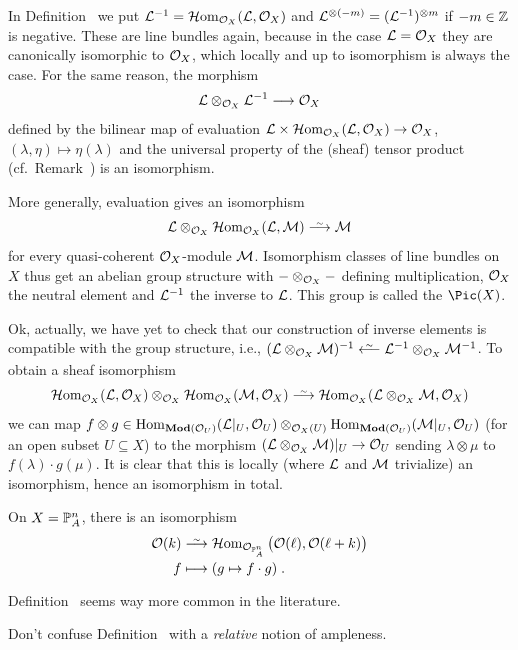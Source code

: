 \documentclass[a4paper,parskip=half,numbers=enddot, DIV=12]{scrreprt}
\begin{document}
\begin{rem}
	\begin{alphanumerate}
		\item {}In Definition~ we put $\mathcal{L}^{-1}=\operatorname{\mathcal{H} om}_{\mathcal{O}_X}(\mathcal{L},\mathcal{O}_X)$ and $\mathcal{L}^{\otimes (-m)}=(\mathcal{L}^{-1})^{\otimes m}$ if $-m\in\mathbb{Z}$ is negative. These are line bundles again, because in the case $\mathcal{L}=\mathcal{O}_X$ they are canonically isomorphic to $\mathcal{O}_X$, which locally and up to isomorphism is always the case. For the same reason, the morphism
		\begin{align*}
			\Ll\otimes_{\Oo_X}\Ll^{-1}\morphism\Oo_X
		\end{align*}
		defined by the bilinear map of evaluation $\Ll\times\Hhom_{\Oo_X}(\Ll,\Oo_X)\morphism\Oo_X$, $(\lambda,\eta)\mapsto\eta(\lambda)$ and the universal property of the (sheaf) tensor product (cf.\ Remark~) is an isomorphism. 
		
		More generally, evaluation gives an isomorphism 
		\begin{align*}
			\Ll\otimes_{\Oo_X}\Hhom_{\Oo_X}(\Ll,\Mm)\isomorphism\Mm
		\end{align*}
		for every quasi-coherent $\mathcal{O}_X$-module $\mathcal{M}$. Isomorphism classes of line bundles on $X$ thus get an abelian group structure with $-\otimes_{\mathcal{O}_X}-$ defining multiplication, $\mathcal{O}_X$ the neutral element and $\mathcal{L}^{-1}$ the inverse to $\mathcal{L}$. This group is called the  $\Pic(X)$.
		
		Ok, actually, we have yet to check that our construction of inverse elements is compatible with the group structure, i.e., $(\Ll\otimes_{\Oo_X}\Mm)^{-1}\lisomorphism \Ll^{-1}\otimes_{\Oo_X}\Mm^{-1}$. To obtain a sheaf isomorphism 
		\begin{align*}
			\Hhom_{\Oo_X}(\Ll,\Oo_X)\otimes_{\Oo_X}\Hhom_{\Oo_X}(\Mm,\Oo_X)\isomorphism\Hhom_{\Oo_X}(\Ll\otimes_{\Oo_X}\Mm,\Oo_X)
		\end{align*}
		we can map $f\otimes g\in\Hom_{\cat{Mod}(\Oo_U)}(\Ll|_U,\Oo_U)\otimes_{\Oo_X(U)}\Hom_{\cat{Mod}(\Oo_U)}(\Mm|_U,\Oo_U)$ (for an open subset $U\subseteq X$) to the morphism $(\Ll\otimes_{\Oo_X}\Mm)|_U\morphism\Oo_U$ sending $\lambda\otimes\mu$ to $f(\lambda)\cdot g(\mu)$. It is clear that this is locally (where $\mathcal{L}$ and $\mathcal{M}$ trivialize) an isomorphism, hence an isomorphism in total.
		\item On $X=\mathbb{P}_A^n$, there is an isomorphism
		\begin{align*}
			\Oo(k)&\isomorphism\Hhom_{\Oo_{\IP_A^n}}\big(\Oo(\ell),\Oo(\ell+k)\big)\\
			f&\longmapsto (g\mapsto f\cdot g)\;.
		\end{align*}
		\item Definition~ seems way more common in the literature.
		\item Don't confuse Definition~ with a \emph{relative} notion of ampleness.
	\end{alphanumerate}
\end{rem}
\end{document}
